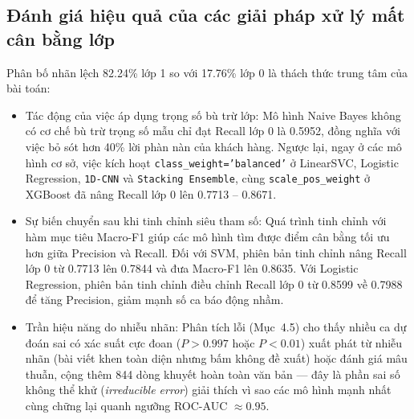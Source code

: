 \subsection{Đánh giá hiệu quả của các giải pháp xử lý mất cân bằng lớp}
Phân bố nhãn lệch 82.24\% lớp 1 so với 17.76\% lớp 0 là thách thức trung tâm của bài toán:
\begin{itemize}
    \item Tác động của việc áp dụng trọng số bù trừ lớp:  
    Mô hình Naive Bayes không có cơ chế bù trừ trọng số mẫu chỉ đạt Recall lớp 0 là 0.5952, đồng nghĩa với việc bỏ sót hơn 40\% lời phàn nàn của khách hàng. Ngược lại, ngay ở các mô hình cơ sở, việc kích hoạt \texttt{class\_weight='balanced'} ở LinearSVC, Logistic Regression, \texttt{1D-CNN} và \texttt{Stacking Ensemble}, cùng \texttt{scale\_pos\_weight} ở XGBoost \cite{he2009} đã nâng Recall lớp 0 lên 0.7713 -- 0.8671.
    \item Sự biến chuyển sau khi tinh chỉnh siêu tham số:  
    Quá trình tinh chỉnh với hàm mục tiêu Macro-F1 giúp các mô hình tìm được điểm cân bằng tối ưu hơn giữa Precision và Recall. Đối với SVM, phiên bản tinh chỉnh nâng Recall lớp 0 từ 0.7713 lên 0.7844 và đưa Macro-F1 lên 0.8635. Với Logistic Regression, phiên bản tinh chỉnh điều chỉnh Recall lớp 0 từ 0.8599 về 0.7988 để tăng Precision, giảm mạnh số ca báo động nhầm.
    \item Trần hiệu năng do nhiễu nhãn:  
    Phân tích lỗi (Mục~4.5) cho thấy nhiều ca dự đoán sai có xác suất cực đoan ($P > 0.997$ hoặc $P < 0.01$) xuất phát từ nhiễu nhãn (bài viết khen toàn diện nhưng bấm không đề xuất) hoặc đánh giá mâu thuẫn, cộng thêm 844 dòng khuyết hoàn toàn văn bản — đây là phần sai số không thể khử (\textit{irreducible error}) giải thích vì sao các mô hình mạnh nhất cùng chững lại quanh ngưỡng ROC-AUC $\approx 0.95$.
\end{itemize}

